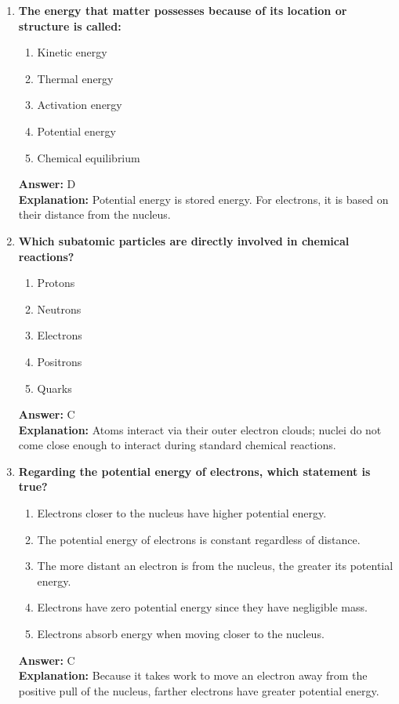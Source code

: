 \documentclass[11pt, a4paper]{article}
\begin{document}
\begin{enumerate}
\item \textbf{The energy that matter possesses because of its location or structure is called:}
\begin{enumerate}[label=\Alph*.]
    \item Kinetic energy
    \item Thermal energy
    \item Activation energy
    \item Potential energy
    \item Chemical equilibrium
\end{enumerate}
\textbf{Answer:} D \\
\textbf{Explanation:} Potential energy is stored energy. For electrons, it is based on their distance from the nucleus.

\item \textbf{Which subatomic particles are directly involved in chemical reactions?}
\begin{enumerate}[label=\Alph*.]
    \item Protons
    \item Neutrons
    \item Electrons
    \item Positrons
    \item Quarks
\end{enumerate}
\textbf{Answer:} C \\
\textbf{Explanation:} Atoms interact via their outer electron clouds; nuclei do not come close enough to interact during standard chemical reactions.

\item \textbf{Regarding the potential energy of electrons, which statement is true?}
\begin{enumerate}[label=\Alph*.]
    \item Electrons closer to the nucleus have higher potential energy.
    \item The potential energy of electrons is constant regardless of distance.
    \item The more distant an electron is from the nucleus, the greater its potential energy.
    \item Electrons have zero potential energy since they have negligible mass.
    \item Electrons absorb energy when moving closer to the nucleus.
\end{enumerate}
\textbf{Answer:} C \\
\textbf{Explanation:} Because it takes work to move an electron away from the positive pull of the nucleus, farther electrons have greater potential energy.


\end{enumerate}
\end{document}
